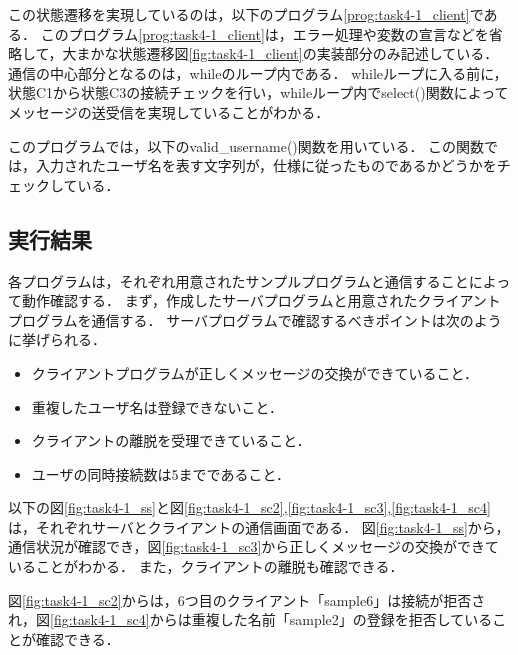\documentclass[a4j,10pt]{jarticle}
\begin{document}
この状態遷移を実現しているのは，以下のプログラム\ref{prog:task4-1_client}である．
このプログラム\ref{prog:task4-1_client}は，エラー処理や変数の宣言などを省略して，大まかな状態遷移図\ref{fig:task4-1_client}の実装部分のみ記述している．
通信の中心部分となるのは，whileのループ内である．
whileループに入る前に，状態C1から状態C3の接続チェックを行い，whileループ内でselect()関数によってメッセージの送受信を実現していることがわかる．
\newpage


このプログラムでは，以下のvalid\_username()関数を用いている．
この関数では，入力されたユーザ名を表す文字列が，仕様に従ったものであるかどうかをチェックしている．

\subsection{実行結果}
各プログラムは，それぞれ用意されたサンプルプログラムと通信することによって動作確認する．
まず，作成したサーバプログラムと用意されたクライアントプログラムを通信する．
サーバプログラムで確認するべきポイントは次のように挙げられる．
\begin{itemize}
  \item クライアントプログラムが正しくメッセージの交換ができていること．
  \item 重複したユーザ名は登録できないこと．
  \item クライアントの離脱を受理できていること．
  \item ユーザの同時接続数は5までであること．
\end{itemize}

以下の図\ref{fig:task4-1_ss}と図\ref{fig:task4-1_sc2},\ref{fig:task4-1_sc3},\ref{fig:task4-1_sc4}は，それぞれサーバとクライアントの通信画面である．
図\ref{fig:task4-1_ss}から，通信状況が確認でき，図\ref{fig:task4-1_sc3}から正しくメッセージの交換ができていることがわかる．
また，クライアントの離脱も確認できる．

図\ref{fig:task4-1_sc2}からは，6つ目のクライアント「sample6」は接続が拒否され，図\ref{fig:task4-1_sc4}からは重複した名前「sample2」の登録を拒否していることが確認できる．
\end{document}
